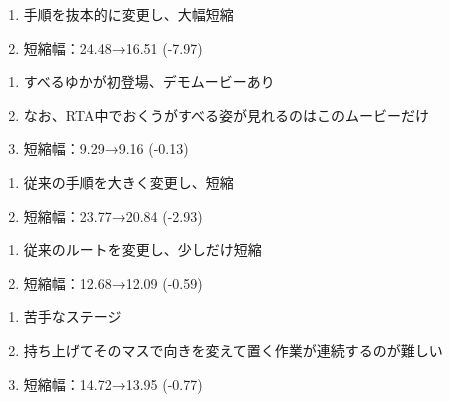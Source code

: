 \begin{enumerate}[label={\sarrow}]
\item 手順を抜本的に変更し、大幅短縮
\item 短縮幅：24.48→16.51 (-7.97)
\end{enumerate}



\begin{enumerate}[label={\sarrow}]
\item すべるゆかが初登場、デモムービーあり
\item なお、RTA中でおくうがすべる姿が見れるのはこのムービーだけ
\item 短縮幅：9.29→9.16 (-0.13)
\end{enumerate}



\clearpage
\begin{enumerate}[label={\sarrow}]
\item 従来の手順を大きく変更し、短縮
\item 短縮幅：23.77→20.84 (-2.93)
\end{enumerate}



\begin{enumerate}[label={\sarrow}]
\item 従来のルートを変更し、少しだけ短縮
\item 短縮幅：12.68→12.09 (-0.59)
\end{enumerate}



\begin{enumerate}[label={\sarrow}]
\item 苦手なステージ
\item 持ち上げてそのマスで向きを変えて置く作業が連続するのが難しい
\item 短縮幅：14.72→13.95 (-0.77)
\end{enumerate}



